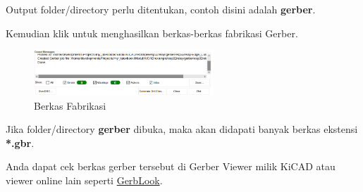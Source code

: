 \documentclass[12pt]{book}
\begin{document}
	Output folder/directory perlu ditentukan, contoh disini adalah \textbf{gerber}.

	Kemudian klik  untuk menghasilkan berkas-berkas fabrikasi Gerber.

	\newpage
	\begin{figure}[!ht]
		\centering
		\includegraphics[width=0.6\textwidth]{images/fab/fab_1}
		\caption{Berkas Fabrikasi}
	\end{figure}

	Jika folder/directory \textbf{gerber} dibuka, maka akan didapati banyak berkas ekstensi \textbf{*.gbr}.

	Anda dapat cek berkas gerber tersebut di Gerber Viewer milik KiCAD atau viewer online lain seperti \href{https://gerblook.org/}{GerbLook}.
\end{document}

